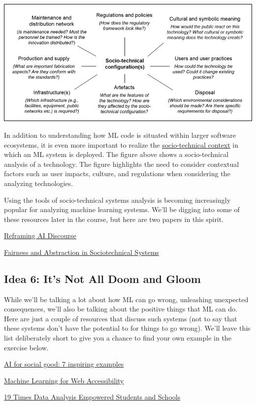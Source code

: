 \documentclass[assignment01_Solutions]{subfiles}
\begin{document}
\begin{center}
\includegraphics[width=\linewidth]{figures/sociotechnical}
\end{center}

In addition to understanding how ML code is situated within larger software ecosystems, it is even more important to realize the \href{https://en.wikipedia.org/wiki/Sociotechnical_system}{socio-technical context} in which an ML system is deployed.  The figure above shows a socio-technical analysis of a technology.  The figure highlights the need to consider contextual factors such as user impacts, culture, and regulations when considering the analyzing technologies.

Using the tools of socio-technical systems analysis is becoming increasingly popular for analyzing machine learning systems.  We'll be digging into some of these resources later in the course, but here are two papers in this spirit.
\bi
\item \href{https://link.springer.com/article/10.1007/s11023-017-9417-6}{Reframing AI Discourse}
\item \href{https://dl.acm.org/citation.cfm?id=3287598}{Fairness and Abstraction in Sociotechnical Systems}
\ei

\subsection*{Idea 6: It's Not All Doom and Gloom}
While we'll be talking a lot about how ML can go wrong, unleashing unexpected consequences, we'll also be talking about the positive things that ML can do.  Here are just a couple of resources that discuss such systems (not to say that these systems don't have the potential to for things to go wrong).  We'll leave this list deliberately short to give you a chance to find your own example in the exercise below.

\bi
\item \href{https://www.springboard.com/blog/ai-for-good/}{AI for social good: 7 inspiring examples}
\item \href{https://medium.com/myplanet-musings/making-the-web-more-accessible-using-machine-learning-8a32eaafdb3a}{Machine Learning for Web Accessibility}
\item \href{https://fpf.org/wp-content/uploads/2016/03/Final_19Times-Data_Mar2016-1.pdf}{19 Times Data Analysis
Empowered Students and Schools}
\ei
\end{document}
